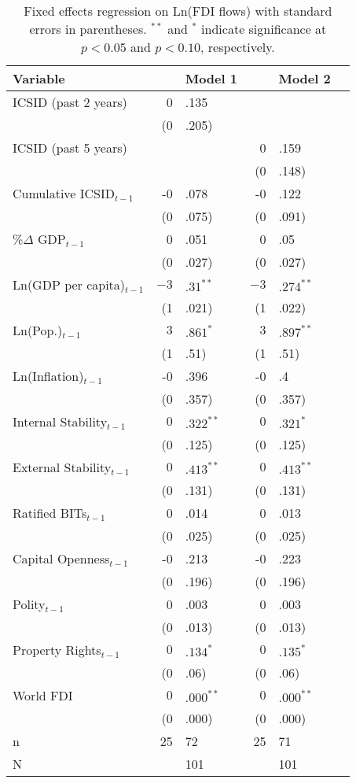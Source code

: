 \begin{enumerate}
\begin{itemize}
			\begin{table}[ht]
			\centering
			\begingroup\footnotesize
			\begin{tabular}{lr@{} lr@{}lr@{}}
			 Variable && Model 1 && Model 2 \\ 
			  \hline
			\hline
			ICSID  (past 2 years) & 0&.135 &&  \\ 
			   & (0&.205) &&  \\ 
			  ICSID  (past 5 years) &  && 0&.159 \\ 
			   &  && (0&.148) \\ 
			  Cumulative ICSID$_{t-1}$ & -0&.078 & -0&.122 \\ 
			   & (0&.075) & (0&.091) \\ 
			  \%$\Delta$ GDP$_{t-1}$ & 0&.051 & 0&.05 \\ 
			   & (0&.027) & (0&.027) \\ 
			  Ln(GDP per capita)$_{t-1}$ & $-3$&$.31^{\ast\ast}$ & $-3$&$.274^{\ast\ast}$ \\ 
			   & (1&.021) & (1&.022) \\ 
			  Ln(Pop.)$_{t-1}$ & $3$&$.861^{\ast}$ & $3$&$.897^{\ast\ast}$ \\ 
			   & (1&.51) & (1&.51) \\ 
			  Ln(Inflation)$_{t-1}$ & -0&.396 & -0&.4 \\ 
			   & (0&.357) & (0&.357) \\ 
			  Internal Stability$_{t-1}$ & $0$&$.322^{\ast\ast}$ & $0$&$.321^{\ast}$ \\ 
			   & (0&.125) & (0&.125) \\ 
			  External Stability$_{t-1}$ & $0$&$.413^{\ast\ast}$ & $0$&$.413^{\ast\ast}$ \\ 
			   & (0&.131) & (0&.131) \\ 
			  Ratified BITs$_{t-1}$ & 0&.014 & 0&.013 \\ 
			   & (0&.025) & (0&.025) \\ 
			  Capital Openness$_{t-1}$ & -0&.213 & -0&.223 \\ 
			   & (0&.196) & (0&.196) \\ 
			  Polity$_{t-1}$ & 0&.003 & 0&.003 \\ 
			   & (0&.013) & (0&.013) \\ 
			  Property Rights$_{t-1}$ & $0$&$.134^{\ast}$ & $0$&$.135^{\ast}$ \\ 
			   & (0&.06) & (0&.06) \\ 
			  World FDI & $0$&$.000^{\ast\ast}$ & $0$&$.000^{\ast\ast}$ \\ 
			   & (0&.000) & (0&.000) \\    
			   \hline
			n & 25&72 & 25&71 \\ 
			  N && 101 && 101 \\ 
			   \hline
			\hline
			\end{tabular}
			\endgroup
			\caption{Fixed effects regression on Ln(FDI flows) with standard errors in parentheses. $^{**}$ and $^{*}$ indicate significance at $p< 0.05 $ and $p< 0.10 $, respectively.} 
			\end{table}
			\FloatBarrier


\end{itemize}
\end{enumerate}
